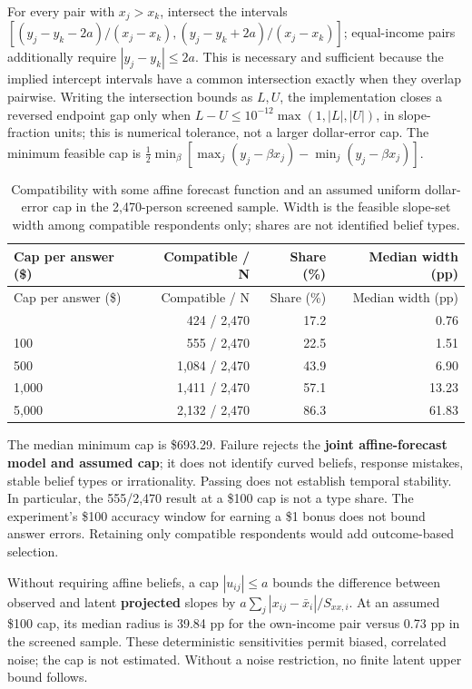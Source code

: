 \documentclass[
  11pt,
  letterpaper,
  DIV=11,
  numbers=noendperiod]{scrartcl}
\begin{document}
For every pair with \(x_j>x_k\), intersect the intervals
\([(y_j-y_k-2a)/(x_j-x_k),(y_j-y_k+2a)/(x_j-x_k)]\); equal-income pairs
additionally require \(|y_j-y_k|\leq2a\). This is necessary and
sufficient because the implied intercept intervals have a common
intersection exactly when they overlap pairwise. Writing the
intersection bounds as \(L,U\), the implementation closes a reversed
endpoint gap only when \(L-U\leq10^{-12}\max(1,|L|,|U|)\), in
slope-fraction units; this is numerical tolerance, not a larger
dollar-error cap. The minimum feasible cap is
\(\tfrac12\min_\beta[\max_j(y_j-\beta x_j)-\min_j(y_j-\beta x_j)]\).

\begin{longtable}[]{@{}lrrr@{}}
\caption{Compatibility with some affine forecast function and an assumed
uniform dollar-error cap in the 2,470-person screened sample. Width is
the feasible slope-set width among compatible respondents only; shares
are not identified belief
types.}\label{tbl-study1-affine}\tabularnewline
\toprule\noalign{}
Cap per answer (\$) & Compatible / N & Share (\%) & Median width (pp) \\
\midrule\noalign{}
\endfirsthead
\toprule\noalign{}
Cap per answer (\$) & Compatible / N & Share (\%) & Median width (pp) \\
\midrule\noalign{}
\endhead
\bottomrule\noalign{}
\endlastfoot
50 & 424 / 2,470 & 17.2 & 0.76 \\
100 & 555 / 2,470 & 22.5 & 1.51 \\
500 & 1,084 / 2,470 & 43.9 & 6.90 \\
1,000 & 1,411 / 2,470 & 57.1 & 13.23 \\
5,000 & 2,132 / 2,470 & 86.3 & 61.83 \\
\end{longtable}

The median minimum cap is \$693.29. Failure rejects the \textbf{joint
affine-forecast model and assumed cap}; it does not identify curved
beliefs, response mistakes, stable belief types or irrationality.
Passing does not establish temporal stability. In particular, the
555/2,470 result at a \$100 cap is not a type share. The experiment's
\$100 accuracy window for earning a \$1 bonus does not bound answer
errors. Retaining only compatible respondents would add outcome-based
selection.

Without requiring affine beliefs, a cap \(|u_{ij}|\leq a\) bounds the
difference between observed and latent \textbf{projected} slopes by
\(a\sum_j|x_{ij}-\bar x_i|/S_{xx,i}\). At an assumed \$100 cap, its
median radius is 39.84 pp for the own-income pair versus 0.73 pp in the
screened sample. These deterministic sensitivities permit biased,
correlated noise; the cap is not estimated. Without a noise restriction,
no finite latent upper bound follows.
\end{document}
